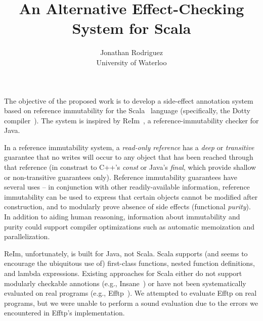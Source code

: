 \documentclass[letterpaper,11pt]{article}
\begin{document}
\title{
	An Alternative Effect-Checking System for Scala
}
\author{Jonathan Rodriguez\\University of Waterloo}
\maketitle

The objective of the proposed work is to develop a side-effect
annotation system based on reference immutability for the Scala~\cite{scala-book} language
(specifically, the Dotty compiler~\cite{dotty}).
The system is inspired by ReIm~\cite{reim}, a reference-immutability checker
for Java.

In a reference immutability system, a \emph{read-only reference}
has a \emph{deep} or \emph{transitive} guarantee that no writes will occur
to any object that has been reached through that reference
(in constrast to C++'s \emph{const} or Java's \emph{final}, which provide shallow
or non-transitive guarantees only).
Reference immutability guarantees have several uses -- in conjunction with other
readily-available information, reference immutability can be used to
express that certain objects cannot be modified after construction, and to
modularly prove absence of side effects (functional \emph{purity}).
In addition to aiding human reasoning,
information about immutability and purity could support compiler
optimizations such as automatic memoization and parallelization.


ReIm, unfortunately, is built for Java, not Scala.
Scala supports (and seems to encourage the ubiquitous use of)
first-class functions, nested function definitions, and lambda expressions.
Existing approaches for Scala either do not support modularly checkable annotions
(e.g., Insane~\cite{effect-analysis-callbacks}) or have not been systematically evaluated
on real programs (e.g., Efftp~\cite{efftp}).
We attempted to evaluate Efftp on real programs, but we were unable to
perform a sound evaluation due to the errors we encountered
in Efftp's implementation.
\end{document}
